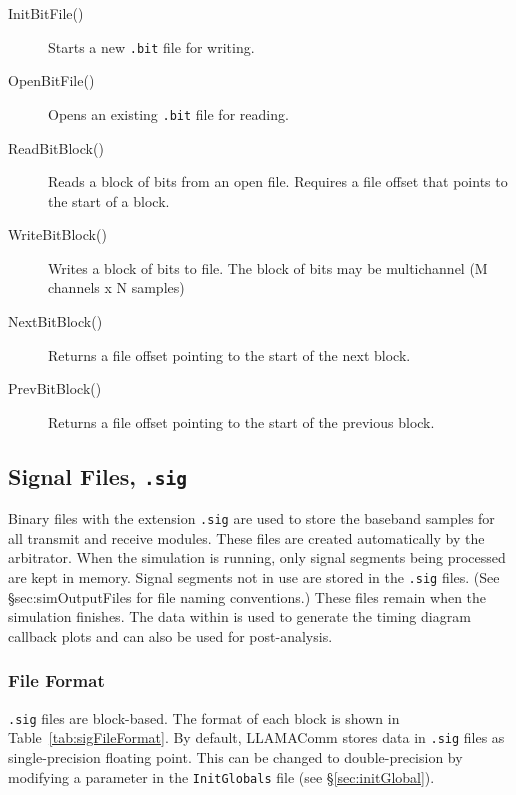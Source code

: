 \begin{description}
\item[InitBitFile()] Starts a new \verb+.bit+ file for writing.

\item[OpenBitFile()] Opens an existing \verb+.bit+ file for reading.

\item[ReadBitBlock()] Reads a block of bits from an open file.  Requires
a file offset that points to the start of a block.

\item[WriteBitBlock()] Writes a block of bits to file.  The block of
bits may be multichannel (M channels x N samples)

\item[NextBitBlock()] Returns a file offset pointing to the start of the
next block.

\item[PrevBitBlock()] Returns a file offset pointing to the start of
the previous block.
\end{description}


\subsection{Signal Files, \texttt{.sig}}\label{sec:sigFiles}

Binary files with the extension \verb+.sig+ are used to store the
baseband samples for all transmit and receive modules.  These files
are created automatically by the arbitrator.  When the simulation is
running, only signal segments being processed are kept in memory.
Signal segments not in use are stored in the \verb+.sig+ files. (See
\S{sec:simOutputFiles} for file naming conventions.) These files
remain when the simulation finishes. The data within is used to
generate the timing diagram callback plots and can also be used for
post-analysis.

\subsubsection{File Format}

\verb+.sig+ files are block-based.  The format of each block is
shown in Table~\ref{tab:sigFileFormat}.  By default, LLAMAComm
stores data in \verb+.sig+ files as single-precision floating point.
This can be changed to double-precision by modifying a parameter in
the \verb+InitGlobals+ file (see \S\ref{sec:initGlobal}).

